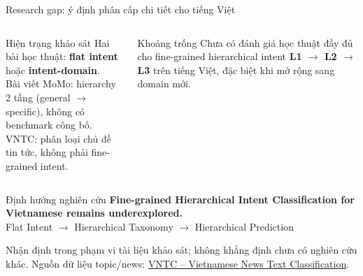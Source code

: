 \documentclass[10pt,aspectratio=169]{beamer}
\newcommand{\kw}[1]{\textcolor{uitblue}{\bfseries #1}}
\begin{document}
\begin{frame}{Research gap: ý định phân cấp chi tiết cho tiếng Việt}
\small
\centering
{}
\vspace{0.22cm}
\begin{columns}[T,onlytextwidth]
\begin{uitbox}{Hiện trạng khảo sát}
\scriptsize
Hai bài học thuật: \kw{flat intent} hoặc \kw{intent-domain}.\\
Bài viết MoMo: hierarchy 2 tầng (general $\rightarrow$ specific), không có benchmark công bố.\\
VNTC: phân loại chủ đề tin tức, không phải fine-grained intent.
\end{uitbox}
\begin{greenbox}{Khoảng trống}
\scriptsize
Chưa có đánh giá học thuật đầy đủ cho fine-grained hierarchical intent \textbf{L1 $\rightarrow$ L2 $\rightarrow$ L3} trên tiếng Việt, đặc biệt khi mở rộng sang domain mới.
\end{greenbox}
\end{columns}
\vspace{0.14cm}
\begin{accentbox}{Định hướng nghiên cứu}
\centering\small
\textbf{Fine-grained Hierarchical Intent Classification for Vietnamese remains underexplored.}\\[0.1cm]
Flat Intent $\rightarrow$ Hierarchical Taxonomy $\rightarrow$ Hierarchical Prediction
\end{accentbox}
{\tiny Nhận định trong phạm vi tài liệu khảo sát; không khẳng định chưa có nghiên cứu khác.
Nguồn dữ liệu topic/news: \href{https://github.com/duyvuleo/VNTC}{VNTC -- Vietnamese News Text Classification}.}
\end{frame}
\end{document}
